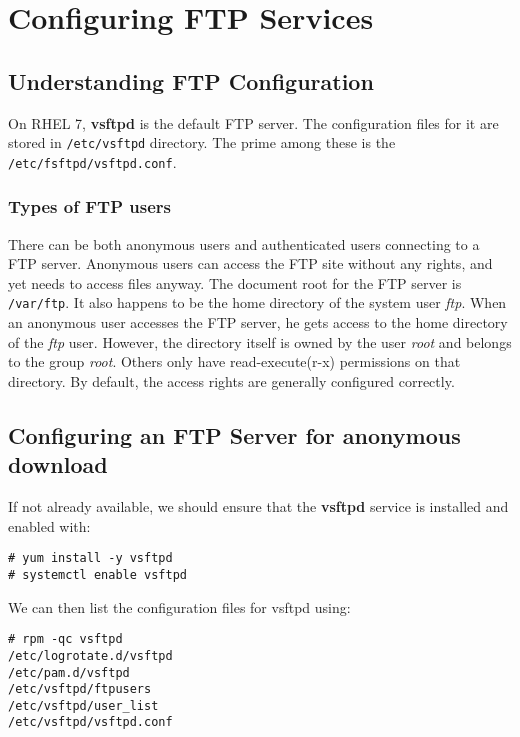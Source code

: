\chapter{Configuring FTP Services}

\section{Understanding FTP Configuration}
On RHEL 7, \textbf{vsftpd} is the default FTP server. The configuration files for it are stored in \verb|/etc/vsftpd| directory. The prime among these is the \verb|/etc/fsftpd/vsftpd.conf|. 

\subsection{Types of FTP users}
There can be both anonymous users and authenticated users connecting to a FTP server. Anonymous users can access the FTP site without any rights, and yet needs to access files anyway. The document root for the FTP server is \verb|/var/ftp|. It also happens to be the home directory of the system user \textit{ftp}. When an anonymous user accesses the FTP server, he gets access to the home directory of the \textit{ftp} user. However, the directory itself is owned by the user \textit{root} and belongs to the group \textit{root}. Others only have read-execute(r-x) permissions on that directory. By default, the access rights are generally configured correctly.

\section{Configuring an FTP Server for anonymous download} 
If not already available, we should ensure that the \textbf{vsftpd} service is installed and enabled with:

\vspace{-15pt}
\begin{verbatim}
# yum install -y vsftpd
# systemctl enable vsftpd
\end{verbatim}
\vspace{-10pt}

\noindent
We can then list the configuration files for vsftpd using:

\vspace{-15pt}
\begin{verbatim}
# rpm -qc vsftpd
/etc/logrotate.d/vsftpd
/etc/pam.d/vsftpd
/etc/vsftpd/ftpusers
/etc/vsftpd/user_list
/etc/vsftpd/vsftpd.conf
\end{verbatim}
\vspace{-10pt}

